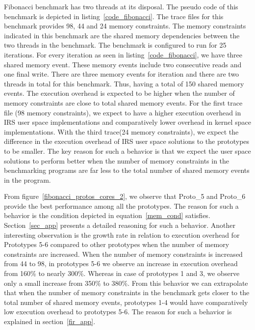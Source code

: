Fibonacci benchmark has two threads at its disposal. 
The pseudo code of this benchmark is depicted in listing~\ref{code_fibonacci}. 
The trace files for this benchmark provides 98, 44 and 24 memory constraints. 
The memory constraints indicated in this benchmark are the shared memory dependencies between the two threads in the benchmark. 
The benchmark is configured to run for 25 iterations. 
For every iteration as seen in listing~\ref{code_fibonacci}, we have three shared memory event. 
These memory events include two consecutive reads and one final write. 
There are three memory events for iteration and there are two threads in total for this benchmark. 
Thus, having a total of 150 shared memory events. 
The execution overhead is expected to be higher when the number of memory constraints are close to total shared memory events. 
For the first trace file (98 memory constraints), we expect to have a higher execution overhead in IRS user space implementations and comparatively lower overhead in kernel space implementations. 
With the third trace(24 memory constraints), we expect the difference in the execution overhead of IRS user space solutions to the prototypes to be smaller. 
The key reason for such a behavior is that we expect the user space solutions to perform better when the number of memory constraints in the benchmarking programs are far less to the total number of shared memory events in the program. 

From figure~\ref{fibonacci_protos_cores_2}, we observe that Proto\_5 and Proto\_6 provide the best performance among all the prototypes. 
The reason for such a behavior is the condition depicted in equation~\ref{mem_cond} satisfies. 
Section~\ref{sec_app} presents a detailed reasoning for such a behavior. 
Another interesting observation is the growth rate in relation to execution overhead for Prototypes 5-6 compared to other prototypes when the number of memory constraints are increased. 
When the number of memory constraints is increased from 44 to 98, in prototypes 5-6 we observe an increase in execution overhead from 160\% to nearly 300\%. 
Whereas in case of prototypes 1 and 3, we observe only a small increase from 350\% to 380\%. 
From this behavior we can extrapolate that when the number of memory constraints in the benchmark gets closer to the total number of shared memory events, prototypes 1-4 would have comparatively low execution overhead to prototypes 5-6. 
The reason for such a behavior is explained in section~\ref{fir_app}. 

